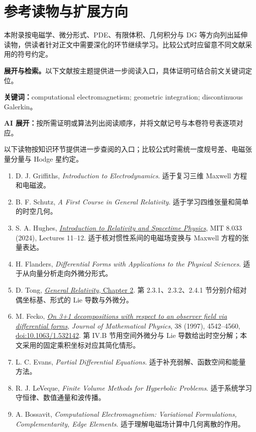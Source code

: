 \documentclass[UTF8,11pt,openany]{ctexbook}
\numberwithin{equation}{chapter}
\theoremstyle{definition}
\theoremstyle{remark}
\newcommand{\studyroute}[3]{%
  \par\smallskip\noindent\textbf{展开与检索。}#1\par
  \noindent\textbf{关键词：}#2。\par
  \noindent\textbf{AI 展开：}#3\par
}
\begin{document}
\chapter{参考读物与扩展方向}
\begin{chaptersummary}
本附录按电磁学、微分形式、PDE、有限体积、几何积分与 DG 等方向列出延伸读物，供读者针对正文中需要深化的环节继续学习。比较公式时应留意不同文献采用的符号约定。
\end{chaptersummary}
\studyroute{以下文献按主题提供进一步阅读入口，具体证明可结合前文关键词定位。}{computational electromagnetism; geometric integration; discontinuous Galerkin}{按所需证明或算法列出阅读顺序，并将文献记号与本卷符号表逐项对应。}
以下读物按知识环节提供进一步查阅的入口；比较公式时需统一度规号差、电磁张量分量与 Hodge 星约定。
\begin{enumerate}
\raggedright
\item D. J. Griffiths, \emph{Introduction to Electrodynamics}. 适于复习三维 Maxwell 方程和电磁波。
\item B. F. Schutz, \emph{A First Course in General Relativity}. 适于学习四维张量和简单的时空几何。
\item S. A. Hughes, \href{https://ocw.mit.edu/courses/8-033-introduction-to-relativity-and-spacetime-physics-fall-2024/mit8_033_f24_lec_full.pdf}{\emph{Introduction to Relativity and Spacetime Physics}}, MIT 8.033 (2024), Lectures 11--12.
适于核对惯性系间的电磁场变换与 Maxwell 方程的张量表达。
\item H. Flanders, \emph{Differential Forms with Applications to the Physical Sciences}. 适于从向量分析走向外微分形式。
\item D. Tong, \href{https://www.davidtong.org/teaching/general-relativity/grhtml/S2}{\emph{General Relativity}, Chapter 2}.
第 2.3.1、2.3.2、2.4.1 节分别介绍对偶坐标基、形式的 Lie 导数与外微分。
\item M. Fecko, \href{https://arxiv.org/abs/gr-qc/9701066}{\emph{On 3+1 decompositions with respect to an observer field via differential forms}},
\emph{Journal of Mathematical Physics}, 38 (1997), 4542--4560,
\href{https://doi.org/10.1063/1.532142}{doi:10.1063/1.532142}.
第 IV.B 节用空间外微分与 Lie 导数给出时空分解；本文采用的固定乘积坐标对应其简化情形。
\item L. C. Evans, \emph{Partial Differential Equations}. 适于补充弱解、函数空间和能量方法。
\item R. J. LeVeque, \emph{Finite Volume Methods for Hyperbolic Problems}. 适于系统学习守恒律、数值通量和波传播。
\item A. Bossavit, \emph{Computational Electromagnetism: Variational Formulations, Complementarity, Edge Elements}. 适于理解电磁场计算中几何离散的作用。

\end{enumerate}
\end{document}
